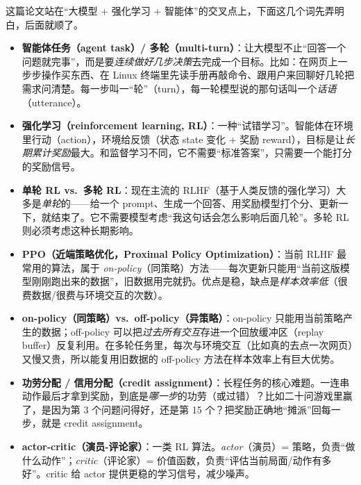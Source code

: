 \documentclass[11pt,UTF8,fontset=fandol]{ctexart}
\begin{document}
这篇论文站在“大模型 + 强化学习 + 智能体”的交叉点上，下面这几个词先弄明白，后面就顺了。

\begin{itemize}[leftmargin=1.5em]
\item \textbf{智能体任务（agent task）/ 多轮（multi-turn）}：让大模型不止“回答一个问题就完事”，而是要\emph{连续做好几步决策}去完成一个目标。比如：在网页上一步步操作买东西、在 Linux 终端里先读手册再敲命令、跟用户来回聊好几轮把需求问清楚。每一步叫一“轮”（turn），每一轮模型说的那句话叫一个\emph{话语}（utterance）。

\item \textbf{强化学习（reinforcement learning, RL）}：一种“试错学习”。智能体在环境里行动（action），环境给反馈（状态 state 变化 + 奖励 reward），目标是让\emph{长期累计奖励}最大。和监督学习不同，它不需要“标准答案”，只需要一个能打分的奖励信号。

\item \textbf{单轮 RL vs.\ 多轮 RL}：现在主流的 RLHF（基于人类反馈的强化学习）大多是\emph{单轮}的——给一个 prompt、生成一个回答、用奖励模型打个分、更新一下，就结束了。它不需要模型考虑“我这句话会怎么影响后面几轮”。多轮 RL 则必须考虑这种长期影响。

\item \textbf{PPO（近端策略优化，Proximal Policy Optimization）}：当前 RLHF 最常用的算法，属于 \emph{on-policy}（同策略）方法——每次更新只能用“当前这版模型刚刚跑出来的数据”，旧数据用完就扔。优点是稳，缺点是\emph{样本效率低}（很费数据/很费与环境交互的次数）。

\item \textbf{on-policy（同策略）vs.\ off-policy（异策略）}：on-policy 只能用当前策略产生的数据；off-policy 可以把\emph{过去所有交互}存进一个回放缓冲区（replay buffer）反复利用。在多轮任务里，每次与环境交互（比如真的去点一次网页）又慢又贵，所以能复用旧数据的 off-policy 方法在样本效率上有巨大优势。

\item \textbf{功劳分配 / 信用分配（credit assignment）}：长程任务的核心难题。一连串动作最后才拿到奖励，到底是\emph{哪一步}的功劳（或过错）？比如二十问游戏里赢了，是因为第 3 个问题问得好，还是第 15 个？把奖励正确地“摊派”回每一步，就是 credit assignment。

\item \textbf{actor-critic（演员-评论家）}：一类 RL 算法。\emph{actor}（演员）= 策略，负责“做什么动作”；\emph{critic}（评论家）= 价值函数，负责“评估当前局面/动作有多好”。critic 给 actor 提供更稳的学习信号，减少噪声。


\end{itemize}
\end{document}
